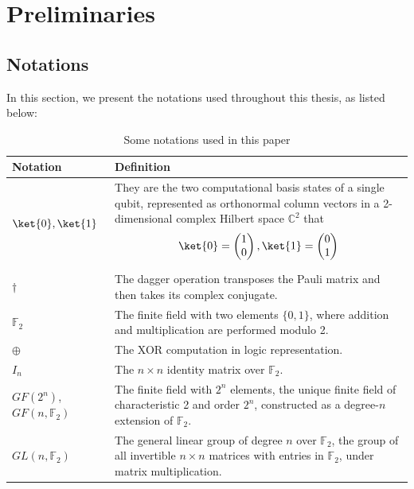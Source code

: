 
\chapter{Preliminaries}
\label{ch:preliminaries}

\section{Notations}
In this section, we present the notations used throughout this thesis, as listed below:

\begin{table}[H]
    \centering
    \begin{tabular}{ |p{2cm}||p{10cm}|  }
        \hline
        Notation  & Definition\\
         \hline
         $\ket{0}, \ket{1}$ & They are the two computational basis states of a single qubit, represented as orthonormal column vectors in a 2-dimensional complex Hilbert space $\mathbb{C}^{2}$ that $$\ket{0} = \begin{pmatrix}1 \\ 0\end{pmatrix}, \ket{1} = \begin{pmatrix}0 \\ 1\end{pmatrix}$$\\
         \hline
         $\dagger$ & The dagger operation transposes the Pauli matrix and then takes its complex conjugate.\\
         \hline
         $\mathbb{F}_{2}$ & The finite field with two elements $\{0, 1\}$, where addition and multiplication are performed modulo 2. \\
         \hline
         $\oplus$ & The XOR computation in logic representation.\\
         \hline
         $I_{n}$ & The $n \times n$ identity matrix over $\mathbb{F}_{2}$.\\
         \hline
         $GF(2^{n})$, $GF(n, \mathbb{F}_{2})$ & The finite field with $2^{n}$ elements, the unique finite field of characteristic 2 and order $2^{n}$, constructed as a degree-$n$ extension of $\mathbb{F}_{2}$.\\
         \hline
         $GL(n, \mathbb{F}_{2})$ & The general linear group of degree $n$ over $\mathbb{F}_{2}$, the group of all invertible $n \times n$ matrices with entries in $\mathbb{F}_{2}$, under matrix multiplication.\\
    \hline
\end{tabular}
    \caption{Some notations used in this paper}
    \label{tab:Notations}
\end{table}



